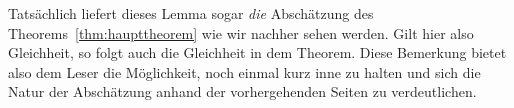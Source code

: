 \begin{bem}
	Tatsächlich liefert dieses Lemma sogar \emph{die} Abschätzung des Theorems~\ref{thm:haupttheorem} wie wir nachher sehen werden. Gilt hier also Gleichheit, so folgt auch die Gleichheit in dem Theorem. Diese Bemerkung bietet also dem Leser die Möglichkeit, noch einmal kurz inne zu halten und sich die Natur der Abschätzung anhand der vorhergehenden Seiten zu verdeutlichen.
\end{bem}
